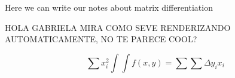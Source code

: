 \documentclass[10pt,a4paper]{article}
\begin{document}
Here we can write our notes about
matrix differentiation 


HOLA GABRIELA MIRA COMO SEVE RENDERIZANDO AUTOMATICAMENTE, NO TE PARECE COOL?

\begin{equation}


    \sum x_{i}^{2} 

    \int \int f(x,y) = \sum \sum \Delta y_{i}x_{i}

   \end{equation}
\end{document}
